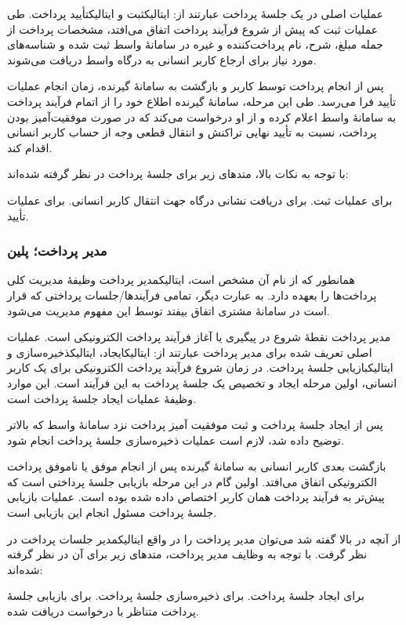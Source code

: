 عملیات اصلی در یک جلسهٔ پرداخت عبارتند از:
‌ایتالیک{ثبت} و
‌ایتالیک{تأیید} پرداخت.
طی عملیات ثبت که پیش از شروع فرآیند پرداخت
اتفاق می‌افتد، مشخصات پرداخت از جمله مبلغ،
شرح، نام پرداخت‌کننده و غیره در سامانهٔ واسط
ثبت شده و شناسه‌های مورد نیاز برای ارجاع
کاربر انسانی به درگاه واسط دریافت می‌شوند.

پس از انجام پرداخت توسط کاربر و
بازگشت به سامانهٔ گیرنده، زمان انجام
عملیات تأیید فرا می‌رسد. طی این مرحله، سامانهٔ
گیرنده اطلاع خود را از اتمام فرآیند پرداخت
به سامانهٔ واسط اعلام کرده و از او درخواست می‌کند
که در صورت موفقیت‌آمیز بودن پرداخت، نسبت به
تأیید نهایی تراکنش و انتقال قطعی وجه از حساب
کاربر انسانی اقدام کند.

با توجه به نکات بالا، متدهای زیر برای جلسهٔ پرداخت
در نظر گرفته شده‌اند:
\begin{itemize}
	  برای عملیات ثبت.
	  برای دریافت نشانی
	درگاه جهت انتقال کاربر انسانی.
	  برای عملیات تأیید.
\end{itemize}

\subsubsection{مدیر پرداخت؛ ‌پلین{}}
همانطور که از نام آن مشخص است،
‌ایتالیک{مدیر پرداخت} وظیفهٔ مدیریت کلی
پرداخت‌ها را بعهده دارد. به عبارت دیگر، تمامی
فرآیندها/جلسات پرداختی که قرار است در سامانهٔ
مشتری اتفاق بیفتد توسط این مفهوم مدیریت می‌شود.

مدیر پرداخت نقطهٔ شروع در پیگیری یا آغاز فرآیند
پرداخت الکترونیکی است. عملیات اصلی تعریف شده برای
مدیر پرداخت عبارتند از: ‌ایتالیک{ایجاد}،
‌ایتالیک{ذخیره‌سازی} و ‌ایتالیک{بازیابی}
جلسهٔ پرداخت. در زمان شروع فرآیند
پرداخت الکترونیکی برای یک کاربر انسانی،
اولین مرحله ایجاد و تخصیص یک جلسهٔ پرداخت به
این فرآیند است. این موارد وظیفهٔ عملیات ایجاد
جلسهٔ پرداخت است.

پس از ایجاد جلسهٔ پرداخت و ثبت موفقیت آمیز
پرداخت نزد سامانهٔ واسط که بالاتر توضیح داده
شد، لازم است عملیات ذخیره‌سازی جلسهٔ پرداخت
انجام شود.

بازگشت بعدی کاربر انسانی به سامانهٔ گیرنده
پس از انجام موفق یا ناموفق پرداخت الکترونیکی
اتفاق می‌افتد. اولین گام در این مرحله بازیابی
جلسهٔ پرداختی است که پیش‌تر به فرآیند پرداخت
همان کاربر اختصاص داده شده بوده است. عملیات
بازیابی جلسهٔ پرداخت مسئول انجام این بازیابی
است.

از آنچه در بالا گفته شد می‌توان مدیر پرداخت را در
واقع ‌ایتالیک{مدیر جلسات پرداخت} در نظر گرفت.
 با توجه به وظایف مدیر پرداخت، متدهای زیر برای
 آن در نظر گرفته شده‌اند:
 
 \begin{itemize}
 	  برای ایجاد جلسهٔ پرداخت.
 	  برای ذخیره‌سازی جلسهٔ پرداخت.
 	  برای بازیابی جلسهٔ پرداخت متناظر با درخواست دریافت شده.
 \end{itemize}
 
 
 